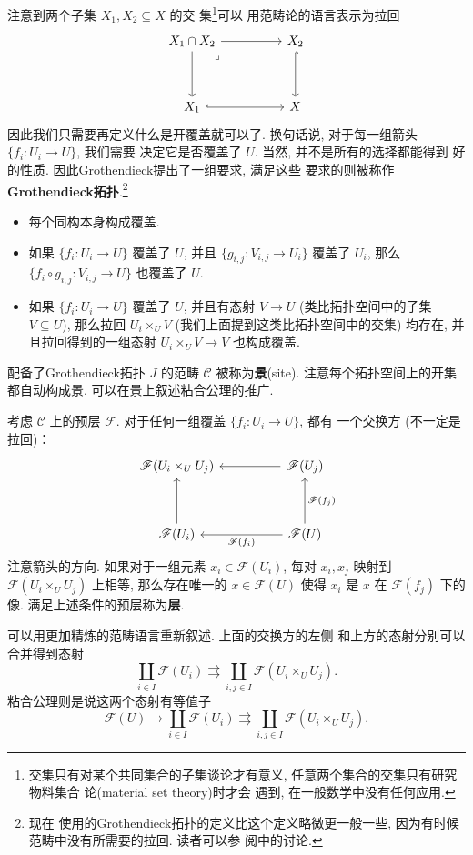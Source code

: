 注意到两个子集 \(X_1, X_2 \subseteq X\) 的交
集\footnote{交集只有对某个共同集合的子集谈论才有意义,
任意两个集合的交集只有研究物料集合
论(material set theory)时才会
遇到, 在一般数学中没有任何应用.}可以
用范畴论的语言表示为拉回
\[\begin{tikzcd}
{X_1 \cap X_2} && {X_2} \\
\\
{X_1} && X
\arrow[hook, from=3-1, to=3-3]
\arrow[hook, from=1-3, to=3-3]
\arrow[from=1-1, to=3-1]
\arrow[from=1-1, to=1-3]
\arrow["\lrcorner"{anchor=center, pos=0.125}, draw=none, from=1-1, to=3-3]
\end{tikzcd}\]
因此我们只需要再定义什么是开覆盖就可以了. 换句话说,
对于每一组箭头 \(\{f_i : U_i \to U\}\), 我们需要
决定它是否覆盖了 \(U\). 当然, 并不是所有的选择都能得到
好的性质. 因此Grothendieck提出了一组要求, 满足这些
要求的则被称作\textbf{Grothendieck拓扑}.\footnote{现在
使用的Grothendieck拓扑的定义比这个定义略微更一般一些,
因为有时候范畴中没有所需要的拉回. 读者可以参
阅\cite{johnstone:2008:elephant}中的讨论.}
\begin{itemize}
\item 每个同构本身构成覆盖.
\item 如果 \(\{f_i : U_i \to U\}\) 覆盖了 \(U\),
并且 \(\{g_{i,j} : V_{i,j} \to U_i\}\) 覆盖了 \(U_i\), 那么
\(\{f_i \circ g_{i,j} : V_{i,j} \to U\}\) 也覆盖了 \(U\).
\item 如果 \(\{f_i : U_i \to U\}\) 覆盖了 \(U\),
并且有态射 \(V \to U\) (类比拓扑空间中的子集 \(V \subseteq U\)),
那么拉回 \(U_i \times_U V\) (我们上面提到这类比拓扑空间中的交集)
均存在, 并且拉回得到的一组态射
\(U_i \times_U V \to V\) 也构成覆盖.
\end{itemize}
配备了Grothendieck拓扑 \(J\) 的范畴 \(\mathcal C\)
被称为\textbf{景}(site). 注意每个拓扑空间上的开集
都自动构成景. 可以在景上叙述粘合公理的推广.
\begin{definition}
考虑 \(\mathcal C\) 上的预层 \(\mathscr F\).
对于任何一组覆盖 \(\{f_i : U_i \to U\}\), 都有
一个交换方 (不一定是拉回)：
\[\begin{tikzcd}
{\mathscr F(U_i \times_U U_j)} && {\mathscr F(U_j)} \\
\\
{\mathscr F(U_i)} && {\mathscr F(U)}
\arrow["{\mathscr F(f_i)}", from=3-3, to=3-1]
\arrow["{\mathscr F(f_j)}"', from=3-3, to=1-3]
\arrow[from=3-1, to=1-1]
\arrow[from=1-3, to=1-1]
\end{tikzcd}\]
注意箭头的方向. 如果对于一组元素 \(x_i \in \mathscr F(U_i)\),
每对 \(x_i, x_j\) 映射到 \(\mathscr F(U_i \times_U U_j)\)
上相等, 那么存在唯一的 \(x \in \mathscr F(U)\) 使得
\(x_i\) 是 \(x\) 在 \(\mathscr F(f_j)\) 下的像.
满足上述条件的预层称为\textbf{层}.
\end{definition}
可以用更加精炼的范畴语言重新叙述. 上面的交换方的左侧
和上方的态射分别可以合并得到态射
\[\coprod_{i \in I} \mathscr F(U_i)
\rightrightarrows \coprod_{i,j \in I} \mathscr F(U_i \times_U U_j).\]
粘合公理则是说这两个态射有等值子
\[\mathscr F(U) \to \coprod_{i \in I} \mathscr F(U_i)
\rightrightarrows \coprod_{i,j \in I} \mathscr F(U_i \times_U U_j).\]

